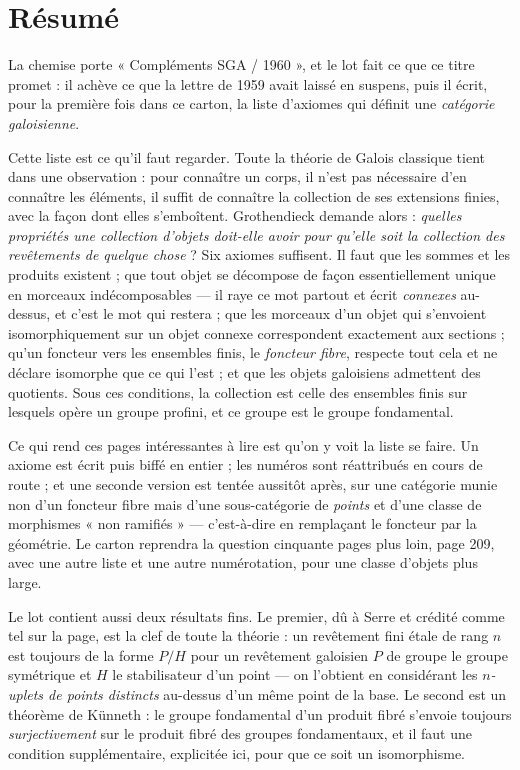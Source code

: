 \documentclass[11pt,a4paper]{article}
\begin{document}
\section*{Résumé}

\begin{resume}
La chemise porte « Compléments SGA / 1960 », et le lot fait ce que ce titre
promet : il achève ce que la lettre de 1959 avait laissé en suspens, puis il
écrit, pour la première fois dans ce carton, la liste d'axiomes qui définit une
\emph{catégorie galoisienne}.

Cette liste est ce qu'il faut regarder. Toute la théorie de Galois classique
tient dans une observation : pour connaître un corps, il n'est pas nécessaire
d'en connaître les éléments, il suffit de connaître la collection de ses
extensions finies, avec la façon dont elles s'emboîtent. Grothendieck demande
alors : \emph{quelles propriétés une collection d'objets doit-elle avoir pour
qu'elle soit la collection des revêtements de quelque chose} ? Six axiomes
suffisent. Il faut que les sommes et les produits existent ; que tout objet se
décompose de façon essentiellement unique en morceaux indécomposables --- il
raye ce mot partout et écrit \emph{connexes} au-dessus, et c'est le mot qui
restera ; que les morceaux d'un objet qui s'envoient isomorphiquement sur un
objet connexe correspondent exactement aux sections ; qu'un foncteur vers les
ensembles finis, le \emph{foncteur fibre}, respecte tout cela et ne déclare
isomorphe que ce qui l'est ; et que les objets galoisiens admettent des
quotients. Sous ces conditions, la collection est celle des ensembles finis sur
lesquels opère un groupe profini, et ce groupe est le groupe fondamental.

Ce qui rend ces pages intéressantes à lire est qu'on y voit la liste se faire.
Un axiome est écrit puis biffé en entier ; les numéros sont réattribués en
cours de route ; et une seconde version est tentée aussitôt après, sur une
catégorie munie non d'un foncteur fibre mais d'une sous-catégorie de
\emph{points} et d'une classe de morphismes « non ramifiés » --- c'est-à-dire
en remplaçant le foncteur par la géométrie. Le carton reprendra la question
cinquante pages plus loin, page 209, avec une autre liste et une autre
numérotation, pour une classe d'objets plus large.

Le lot contient aussi deux résultats fins. Le premier, dû à Serre et crédité
comme tel sur la page, est la clef de toute la théorie : un revêtement fini
étale de rang $n$ est toujours de la forme $P/H$ pour un revêtement galoisien
$P$ de groupe le groupe symétrique et $H$ le stabilisateur d'un point --- on
l'obtient en considérant les \emph{$n$-uplets de points distincts} au-dessus
d'un même point de la base. Le second est un théorème de Künneth : le groupe
fondamental d'un produit fibré s'envoie toujours \emph{surjectivement} sur le
produit fibré des groupes fondamentaux, et il faut une condition
supplémentaire, explicitée ici, pour que ce soit un isomorphisme.


\end{resume}
\end{document}
